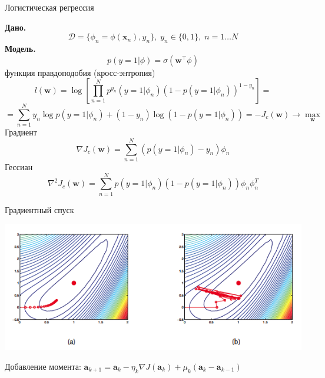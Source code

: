\documentclass[10pt]{beamer}
\begin{document}
\begin{frame}{Логистическая регрессия}

{\bf Дано.}
\[
\mathcal{D} = \{\phi_n = \phi(\mathbf{x}_n), y_n\}, \; y_n \in \{ 0,1\}, \; n = 1 \ldots N
\]
{\bf Модель.}
\[
p(y=1 | \phi) = \sigma(\mathbf{w}^\top \phi)
\]
функция правдоподобия (кросс-энтропия)
\[
l(\mathbf{w}) = \log \left[ \prod_{n=1}^N p^{y_n}(y=1 | \phi_n) (1 - p(y=1 | \phi_n))^{1 - y_n}\right] = 
\]
\[
= \sum_{n=1}^N {y_n \log p(y=1 | \phi_n) + (1- y_n) \log (1 - p(y=1 | \phi_n))} = - J_c(\mathbf{w}) \rightarrow \max_{\mathbf{w}}
\]
Градиент
\[
\nabla J_c(\mathbf{w}) = \sum_{n=1}^N (p(y=1 | \phi_n) - y_n) \phi_n
\]
Гессиан
\[
\nabla^2 J_c(\mathbf{w}) = \sum_{n=1}^N p(y=1 | \phi_n) (1 - p(y=1 | \phi_n)) \phi_n \phi_n^T
\]

\end{frame}


\begin{frame}{Градиентный спуск}

	\gd

	\begin{center}
   		\includegraphics[scale=0.4]{images/gd.png}   		
    \end{center}
    
    Добавление момента: $\mathbf{a}_{k+1} = \mathbf{a}_k - \eta_k \nabla J (\mathbf{a}_k) + \mu_k (\mathbf{a}_{k} - \mathbf{a}_{k-1})$

\end{frame}

\end{document}
